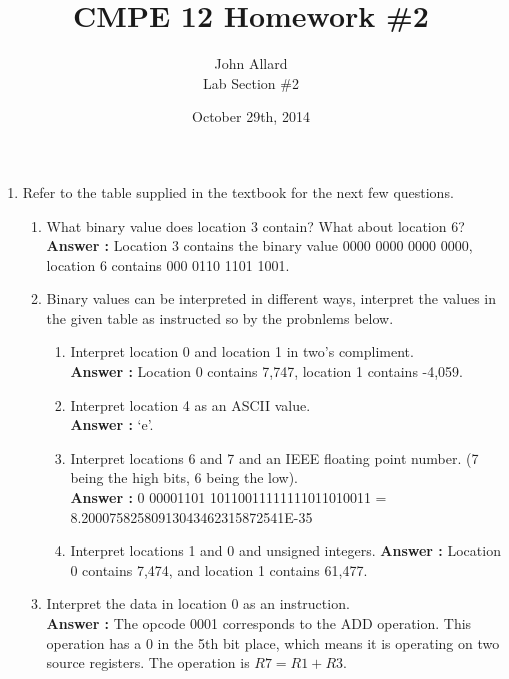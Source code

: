 \documentclass[a4paper,11pt]{article}
\title{ CMPE 12 Homework \#2 \\[7 in]}
\author{John Allard \\ Lab Section \#2}
\date{October 29th, 2014}
\newcommand{\answer}{\textbf{Answer : }}
\begin{document}
\maketitle
\newpage


\begin{enumerate}

\item Refer to the table supplied in the textbook for the next few questions.
  
  \begin{enumerate}
  \item What binary value does location 3 contain? What about location 6? \\
  \answer Location 3 contains the binary value \small{0000 0000 0000 0000}, location 6 contains \small{000 0110 1101 1001}.

  \item Binary values can be interpreted in different ways, interpret the values in the given table as instructed so by the probnlems below.
    \begin{enumerate}
    \item Interpret location 0 and location 1 in two's compliment. \\
    \answer Location 0 contains 7,747, location 1 contains -4,059.
    \item Interpret location 4 as an ASCII value. \\
    \answer `e'.
    \item Interpret locations 6 and 7 and an IEEE floating point number. (7 being the high bits, 6 being the low). \\
    \answer \small{0 00001101 10110011111111011010011} = 8.20007582580913043462315872541E-35 
    \item Interpret locations 1 and 0 and unsigned integers.
    \answer Location 0 contains 7,474, and location 1 contains 61,477.
    \end{enumerate}

  \item Interpret the data in location 0 as an instruction. \\
  \answer The opcode \small{0001} corresponds to the ADD operation. This operation has a \small{0} in the 5th bit place, which means it is operating on two source registers. The operation is $R7= R1+R3$.


\end{enumerate}
\end{enumerate}
\end{document}
